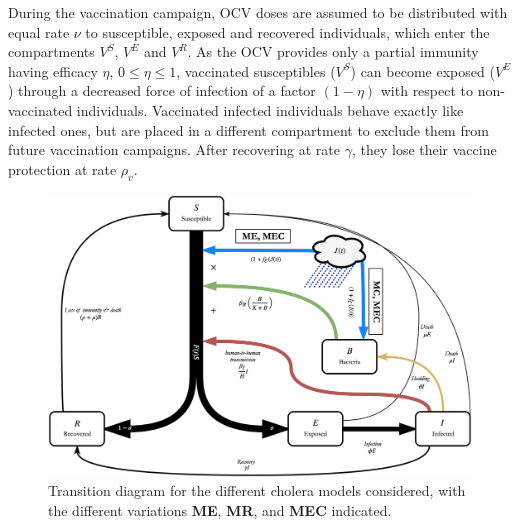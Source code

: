 During the vaccination campaign, OCV doses are assumed to be distributed with equal rate $\nu$ to susceptible, exposed and recovered individuals, which enter the compartments $V^S$, $V^E$ and $V^R$. As the OCV provides only a partial immunity having efficacy $\eta$, $0\leq \eta \leq 1$, vaccinated susceptibles ($V^S$) can become exposed ($V^E$) through a decreased force of infection of a factor $(1-\eta)$ with respect to non-vaccinated individuals. Vaccinated infected individuals behave exactly like infected ones, but are placed in a different compartment to exclude them from future vaccination campaigns. After recovering at  rate $\gamma$, they lose their vaccine protection at rate $\rho_{v}$.
\begin{figure}
  \centering
  \includegraphics[width=\textwidth]{fig_cholera-rainfall/Lemaitre_ACTROP_2018_42_R1_fig1.png}
  \caption[Transition diagram for the competing cholera models]{Transition diagram for the different cholera models considered, with the different variations \textbf{ME}, \textbf{MR}, and \textbf{MEC} indicated.}
  \label{diagram}
\end{figure}

